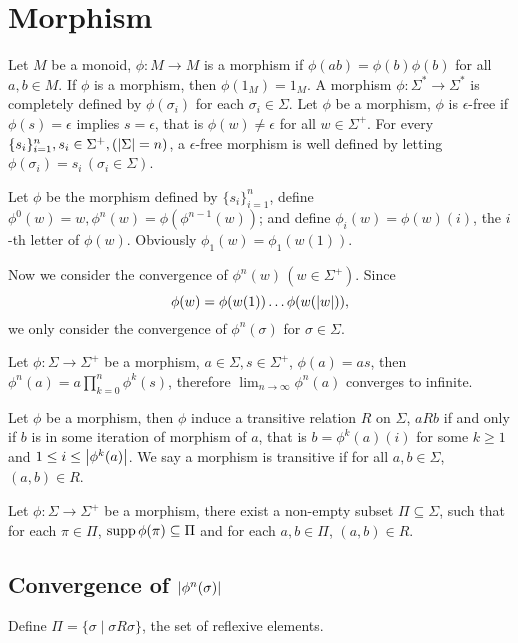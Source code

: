 \section{Morphism}
Let $M$ be a monoid, $\phi : M \to M$ is a morphism if $\phi(ab) = \phi(b)\phi(b)$ for all $a, b \in M$.
If $\phi$ is a morphism, then $\phi(1_M) = 1_M$.
A morphism $\phi : \Sigma^\ast \to \Sigma^\ast$ is completely defined by $\phi(\sigma_i)$ for each $\sigma_i \in \Sigma$.
Let $\phi$ be a morphism, $\phi$ is $\epsilon$-free if $\phi(s) = \epsilon$ implies $s = \epsilon$, 
that is $\phi(w) \neq \epsilon$ for all $w \in \Sigma^+$.
For every $\{s_i\}_{i=1}^n, s_i \in \Sigma^+, (\left| {\Sigma} \right| = n)$, 
a $\epsilon$-free morphism is well defined by letting $\phi(\sigma_i) = s_i \, (\sigma_i \in \Sigma)$.

Let $\phi$ be the morphism defined by $\{s_i\}_{i=1}^n$, 
define $\phi^0(w) = w, \phi^n(w) = \phi(\phi^{n-1}(w))$;
and define $\phi_i(w) = \phi(w)(i)$, the $i$-th letter of $\phi(w)$.
Obviously $\phi_1(w) = \phi_1(w(1))$.

Now we consider the convergence of $\phi^n(w) \, (w \in \Sigma^+)$.
Since $$\phi(w) = \phi(w(1)) \dots \phi(w(\left| {w} \right|)),$$
we only consider the convergence of $\phi^n(\sigma)$ for $\sigma \in \Sigma$.
\begin{pro}
Let $\phi : \Sigma \to \Sigma^+$ be a morphism, $a \in \Sigma, s \in \Sigma^+$, 
$\phi(a) = as$, then $\phi^n(a) = a\prod_{k=0}^n \phi^k(s)$, 
therefore $\lim_{n \to \infty} \phi^n(a)$ converges to infinite.
\end{pro}

Let $\phi$ be a morphism, then $\phi$ induce a transitive relation $R$ on $\Sigma$,
$a R b$ if and only if $b$ is in some iteration of morphism of $a$, 
that is $b = \phi^k(a)(i)$ for some $k \geq 1$ and $1 \leq i \leq \left| {\phi^k(a)} \right|$.
We say a morphism is transitive if for all $a, b \in \Sigma$, $(a, b) \in R$.
\begin{pro}
Let $\phi : \Sigma \to \Sigma^+$ be a morphism, there exist a non-empty subset $\Pi \subseteq \Sigma$, 
such that for each $\pi \in \Pi$, $\mathop{\mathrm{supp}} \phi(\pi) \subseteq \Pi$ and for each $a, b \in \Pi$, 
$(a, b) \in R$.
\end{pro}

\subsection{Convergence of $\left| {\phi^n(\sigma)} \right|$}
Define $\Pi = \{\sigma \mid \sigma R \sigma\}$, the set of 
reflexive elements.

